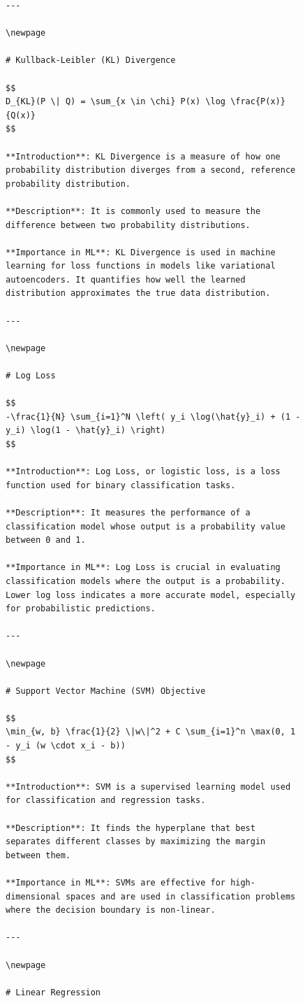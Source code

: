 \documentclass[
  12 pt,
  a4paper,
]{book}
\numberwithin{equation}{section}
\theoremstyle{plain}      %
\theoremstyle{definition} %
\theoremstyle{remark}     %
\theoremstyle{note}         %
\begin{document}
\begin{figure}
\begin{verbatim}
---

\newpage

# Kullback-Leibler (KL) Divergence

$$
D_{KL}(P \| Q) = \sum_{x \in \chi} P(x) \log \frac{P(x)}{Q(x)}
$$

**Introduction**: KL Divergence is a measure of how one probability distribution diverges from a second, reference probability distribution.

**Description**: It is commonly used to measure the difference between two probability distributions.

**Importance in ML**: KL Divergence is used in machine learning for loss functions in models like variational autoencoders. It quantifies how well the learned distribution approximates the true data distribution.

---

\newpage

# Log Loss

$$
-\frac{1}{N} \sum_{i=1}^N \left( y_i \log(\hat{y}_i) + (1 - y_i) \log(1 - \hat{y}_i) \right)
$$

**Introduction**: Log Loss, or logistic loss, is a loss function used for binary classification tasks.

**Description**: It measures the performance of a classification model whose output is a probability value between 0 and 1.

**Importance in ML**: Log Loss is crucial in evaluating classification models where the output is a probability. Lower log loss indicates a more accurate model, especially for probabilistic predictions.

---

\newpage

# Support Vector Machine (SVM) Objective

$$
\min_{w, b} \frac{1}{2} \|w\|^2 + C \sum_{i=1}^n \max(0, 1 - y_i (w \cdot x_i - b))
$$

**Introduction**: SVM is a supervised learning model used for classification and regression tasks.

**Description**: It finds the hyperplane that best separates different classes by maximizing the margin between them.

**Importance in ML**: SVMs are effective for high-dimensional spaces and are used in classification problems where the decision boundary is non-linear.

---

\newpage

# Linear Regression


\end{verbatim}
\end{figure}
\end{document}
